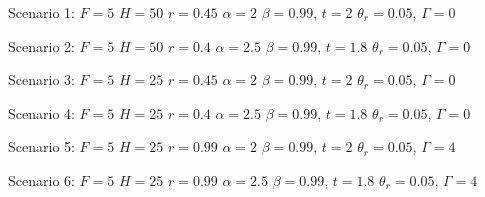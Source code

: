 \item Scenario 1: \(F=5\) \(H=50\)  \(r=0.45\) \(\alpha=2\) \(\beta=0.99\), \(t=2\) \(\theta_r=0.05\), \(\Gamma=0\)
\item Scenario 2: \(F=5\) \(H=50\)  \(r=0.4\) \(\alpha=2.5\) \(\beta=0.99\), \(t=1.8\) \(\theta_r=0.05\), \(\Gamma=0\)
\item Scenario 3: \(F=5\) \(H=25\)  \(r=0.45\) \(\alpha=2\) \(\beta=0.99\), \(t=2\) \(\theta_r=0.05\), \(\Gamma=0\)
\item Scenario 4: \(F=5\) \(H=25\)  \(r=0.4\) \(\alpha=2.5\) \(\beta=0.99\), \(t=1.8\) \(\theta_r=0.05\), \(\Gamma=0\)
\item Scenario 5: \(F=5\) \(H=25\)  \(r=0.99\) \(\alpha=2\) \(\beta=0.99\), \(t=2\) \(\theta_r=0.05\), \(\Gamma=4\)
\item Scenario 6: \(F=5\) \(H=25\)  \(r=0.99\) \(\alpha=2.5\) \(\beta=0.99\), \(t=1.8\) \(\theta_r=0.05\), \(\Gamma=4\)
